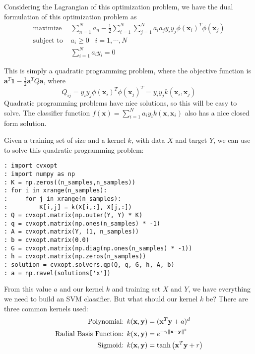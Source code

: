 Considering the Lagrangian of this optimization problem, we have the dual formulation of this optimization problem as
\begin{align*}
\text{maximize } & \sum_{n=1}^{N} a_{n} - \frac{1}{2} \sum_{i=1}^{N}\sum_{j=1}^{N} a_{i}a_{j}y_{i}y_{j}\phi(\mathbf{x}_{i})^{T}\phi(\mathbf{x}_{j}) \\
\text{subject to } & a_{i} \geq 0 \; \; \; i = 1, \cdots, N \\
 & \sum_{i=1}^{N} a_{i}y_{i} = 0
\end{align*}

This is simply a quadratic programming problem, where the objective function is 
$\mathbf{a}^{T}\mathbf{1} - \frac{1}{2} \mathbf{a}^{T}Q\mathbf{a}$, where 
\begin{equation*}
Q_{ij} = y_{i}y_{j}\phi(\mathbf{x}_{i})^{T}\phi(\mathbf{x}_{j})^{T} = y_{i}y_{j}k(\mathbf{x}_{i},\mathbf{x}_{j})
\end{equation*}
Quadratic programming problems have nice solutions, so this will be easy to solve. 
The classifier function $f(\mathbf{x}) = \sum_{i=1}^{N} a_{i}y_{i}k(\mathbf{x},\mathbf{x}_{i})$ 
also has a nice closed form solution.

Given a training set of size  and a kernel $k$, with data $X$ and target $Y$, 
we can use  to solve this quadratic programming problem:
\begin{lstlisting}
: import cvxopt
: import numpy as np
: K = np.zeros((n_samples,n_samples))
: for i in xrange(n_samples):
:     for j in xrange(n_samples):
:         K[i,j] = k(X[i,:], X[j,:])
: Q = cvxopt.matrix(np.outer(Y, Y) * K)
: q = cvxopt.matrix(np.ones(n_samples) * -1)
: A = cvxopt.matrix(Y, (1, n_samples))
: b = cvxopt.matrix(0.0)
: G = cvxopt.matrix(np.diag(np.ones(n_samples) * -1))
: h = cvxopt.matrix(np.zeros(n_samples))
: solution = cvxopt.solvers.qp(Q, q, G, h, A, b)
: a = np.ravel(solutions['x'])
\end{lstlisting}
From this value $a$ and our kernel $k$ and training set $X$ and $Y$, we have everything we need to build an SVM classifier. 
But what should our kernel $k$ be?
There are three common kernels used:
\begin{align*}
\text{Polynomial: } & k(\mathbf{x},\mathbf{y}) = (\mathbf{x}^{T}\mathbf{y} + a)^{d} \\
\text{Radial Basis Function: } & k(\mathbf{x},\mathbf{y}) = e^{-\gamma \left\lVert\mathbf{x} - \mathbf{y}\right\rVert^{2}} \\
\text{Sigmoid: } & k(\mathbf{x},\mathbf{y}) = \tanh \left(\mathbf{x}^{T}\mathbf{y} + r \right)
\end{align*}

